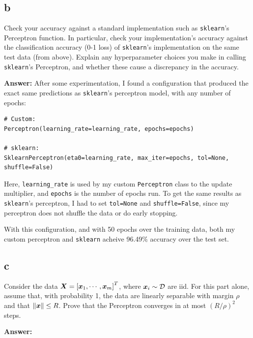 \documentclass{article}
\begin{document}
\subsection{b}
Check your accuracy against a standard implementation such as \verb|sklearn|’s Perceptron function.
In particular, check your implementation’s accuracy against the classification accuracy (0-1 loss) of \verb|sklearn|’s implementation on the same test data (from above).
Explain any hyperparameter choices you make in calling \verb|sklearn|’s Perceptron, and whether these cause a discrepancy in the accuracy. 

\textbf{Answer:}
After some experimentation, I found a configuration that produced the exact same predictions as \verb|sklearn|'s perceptron model, with any number of epochs:
\begin{small}
\begin{verbatim}
# Custom:
Perceptron(learning_rate=learning_rate, epochs=epochs)

# sklearn:
SklearnPerceptron(eta0=learning_rate, max_iter=epochs, tol=None, shuffle=False)
\end{verbatim}
\end{small}

Here, \verb|learning_rate| is used by my custom \verb|Perceptron| class to the update multiplier, and \verb|epochs| is the number of epochs run.
To get the same results as \verb|sklearn|'s perceptron, I had to set \verb|tol=None| and \verb|shuffle=False|, since my perceptron does not shuffle the data or do early stopping.

With this configuration, and with 50 epochs over the training data, both my custom perceptron and \verb|sklearn| acheive 96.49\% accuracy over the test set.

\subsection{c}
Consider the data $\mtx{X} = \left[\vct{x}_1, \cdots, \vct{x}_m\right]^T$, where $\bm{x}_i \sim \mathcal{D}$ are iid.
For this part alone, assume that, with probability 1, the data are linearly separable with margin $\rho$ and that $\|\bm{x}\| \leq R$.
Prove that the Perceptron converges in at most $(R/\rho)^2$ steps.

\textbf{Answer:}
\end{document}
